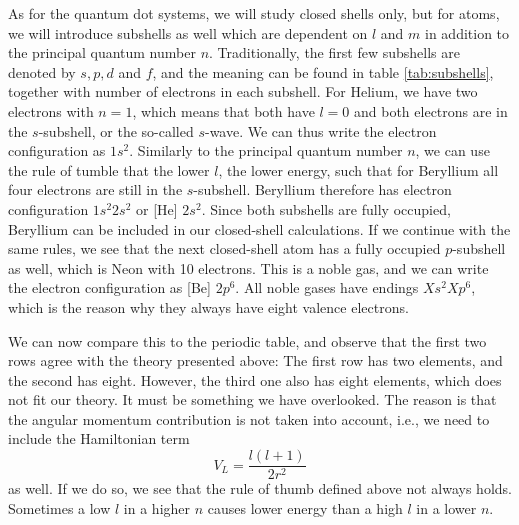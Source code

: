 As for the quantum dot systems, we will study closed shells only, but for atoms, we will introduce subshells as well which are dependent on $l$ and $m$ in addition to the principal quantum number $n$. Traditionally, the first few subshells are denoted by $s, p, d$ and $f$, and the meaning can be found in table \eqref{tab:subshells}, together with number of electrons in each subshell. For Helium, we have two electrons with $n=1$, which means that both have $l=0$ and both electrons are in the $s$-subshell, or the so-called $s$-wave. We can thus write the electron configuration as $1s^2$. Similarly to the principal quantum number $n$, we can use the rule of tumble that the lower $l$, the lower energy, such that for Beryllium all four electrons are still in the $s$-subshell. Beryllium therefore has electron configuration $1s^2 2s^2$ or [He] $2s^2$. Since both subshells are fully occupied, Beryllium can be included in our closed-shell calculations. If we continue with the same rules, we see that the next closed-shell atom has a fully occupied $p$-subshell as well, which is Neon with 10 electrons. This is a noble gas, and we can write the electron configuration as [Be] $2p^6$. All noble gases have endings $Xs^2 Xp^6$, which is the reason why they always have eight valence electrons.

We can now compare this to the periodic table, and observe that the first two rows agree with the theory presented above: The first row has two elements, and the second has eight. However, the third one also has eight elements, which does not fit our theory. It must be something we have overlooked. The reason is that the angular momentum contribution is not taken into account, i.e., we need to include the Hamiltonian term
\begin{equation}
V_L=\frac{l(l+1)}{2r^2}
\end{equation}
as well. If we do so, we see that the rule of thumb defined above not always holds. Sometimes a low $l$ in a higher $n$ causes lower energy than a high $l$ in a lower $n$.

